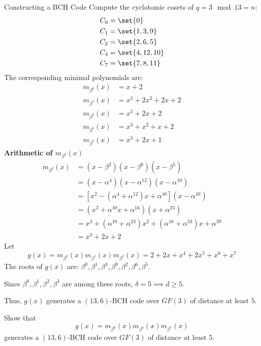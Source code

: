 \begin{Example}{Constructing a BCH Code}{}
    Compute the cyclotomic cosets of $ q=3\mod 13=n $:
    \begin{align*}
        C_0 & =\set{0}       \\
        C_1 & =\set{1,3,9}   \\
        C_2 & =\set{2,6,5}   \\
        C_4 & =\set{4,12,10} \\
        C_7 & =\set{7,8,11}
    \end{align*}
    The corresponding minimal polynomials are:
    \begin{align*}
        m_{\beta^0}(x) & =x+2           \\
        m_{\beta^1}(x) & =x^3+2x^2+2x+2 \\
        m_{\beta^2}(x) & =x^3+2x+2      \\
        m_{\beta^4}(x) & =x^3+x^2+x+2   \\
        m_{\beta^7}(x) & =x^3+2x+1
    \end{align*}
    \textbf{Arithmetic of $ m_{\beta^2}(x) $}
    \begin{align*}
        m_{\beta^2}(x)
         & =(x-\beta^2)(x-\beta^6)(x-\beta^5)                                     \\
         & =(x-\alpha^4)(x-\alpha^{12})(x-\alpha^{10})                            \\
         & =\left[ x^2-(\alpha^4+\alpha^{12})x+\alpha^{16} \right](x-\alpha^{10}) \\
         & =(x^2+\alpha^{10}x+\alpha^{16})(x+\alpha^{23})                         \\
         & =x^3+(\alpha^{10}+\alpha^{23})x^2+(\alpha^{16}+\alpha^{33})x+
        \alpha^{39}                                                               \\
         & =x^3+2x+2
    \end{align*}
    Let
    \[ g(x)=m_{\beta^0}(x)m_{\beta^1}(x)m_{\beta^2}(x)=2+2x+x^4+2x^5+x^6+x^7 \]
    The roots of $ g(x) $ are:
    $ \beta^0,\beta^1,\beta^3,\beta^9,\beta^2,\beta^6,\beta^5 $.

    Since $ \beta^0,\beta^1,\beta^2,\beta^3 $ are among these roots,
    $ \delta=5\implies d\geqslant 5 $.

    Thus, $ g(x) $ generates a $ (13,6) $-BCH code over $ GF(3) $
    of distance at least $ 5 $.
\end{Example}

\begin{Exercise}{}{}
    Show that
    \[ g(x)=m_{\beta^0}(x)m_{\beta^4}(x)m_{\beta^7}(x) \]
    generates a $ (13,6) $-BCH code over $ GF(3) $ of distance at least $ 5 $.
\end{Exercise}

